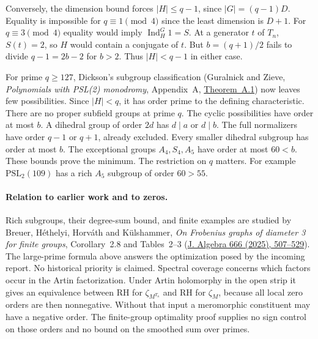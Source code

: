 Conversely, the dimension bound forces $|H|\le q-1$, since $|G|=(q-1)D$. Equality is impossible for $q\equiv1\pmod4$ since the least dimension is $D+1$. For $q\equiv3\pmod4$ equality would imply $\operatorname{Ind}_H^G1=S$. At a generator $t$ of $T_n$, $S(t)=2$, so $H$ would contain a conjugate of $t$. But $b=(q+1)/2$ fails to divide $q-1=2b-2$ for $b>2$. Thus $|H|<q-1$ in either case.

For prime $q\ge127$, Dickson's subgroup classification (Guralnick and Zieve, \emph{Polynomials with PSL(2) monodromy}, Appendix~A, \href{https://annals.math.princeton.edu/wp-content/uploads/annals-v172-n2-p11-p.pdf}{Theorem~A.1}) now leaves few possibilities. Since $|H|<q$, it has order prime to the defining characteristic. There are no proper subfield groups at prime $q$. The cyclic possibilities have order at most $b$. A dihedral group of order $2d$ has $d\mid a$ or $d\mid b$. The full normalizers have order $q-1$ or $q+1$, already excluded. Every smaller dihedral subgroup has order at most $b$. The exceptional groups $A_4,S_4,A_5$ have order at most $60<b$. These bounds prove the minimum. The restriction on $q$ matters. For example $\mathrm{PSL}_2(109)$ has a rich $A_5$ subgroup of order $60>55$.

\paragraph{Relation to earlier work and to zeros.}
Rich subgroups, their degree-sum bound, and finite examples are studied by Breuer, H\'ethelyi, Horv\'ath and K\"ulshammer, \emph{On Frobenius graphs of diameter 3 for finite groups}, Corollary~2.8 and Tables~2--3 (\href{https://doi.org/10.1016/j.jalgebra.2024.11.014}{J. Algebra 666 (2025), 507--529}). The large-prime formula above answers the optimization posed by the incoming report. No historical priority is claimed. Spectral coverage concerns which factors occur in the Artin factorization. Under Artin holomorphy in the open strip it gives an equivalence between RH for $\zeta_{M^{T_n}}$ and RH for $\zeta_M$, because all local zero orders are then nonnegative. Without that input a meromorphic constituent may have a negative order. The finite-group optimality proof supplies no sign control on those orders and no bound on the smoothed sum over primes.

